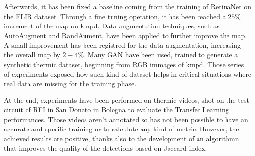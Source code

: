 \documentclass[11pt]{article}
\begin{document}
    Afterwards, it has been fixed a baseline coming from the training of RetinaNet on the FLIR dataset. Through a fine tuning operation, it has been reached a $25\%$ increment of the \acrfull{map} on \acrshort{kmpd}. Data augmentation techniques, such as AutoAugment and RandAument, have been applied to further improve the \acrshort{map}. A small improvement has been registred for the data augmentation, increasing the overall \acrshort{map} by $2-4\%$.
    Many \acrfull{GAN} have been used, trained to generate a synthetic thermic dataset, beginning from RGB immages of \acrshort{kmpd}. Those series of experiments exposed how such kind of dataset helps in critical situations where real data are missing for the training phase.

    At the end, experiments have been performed on thermic videos, shot on the test circuit of \acrfull{RFI} in San Donato in Bologna to evaluate the Transfer Learning performances. Those videos aren't annotated so has not been possible to have an accurate and specific training or to calculate any kind of metric. However, the achieved results are positive, thanks also to the development of an algorithmn that improves the quality of the detections based on Jaccard index.
\end{document}
